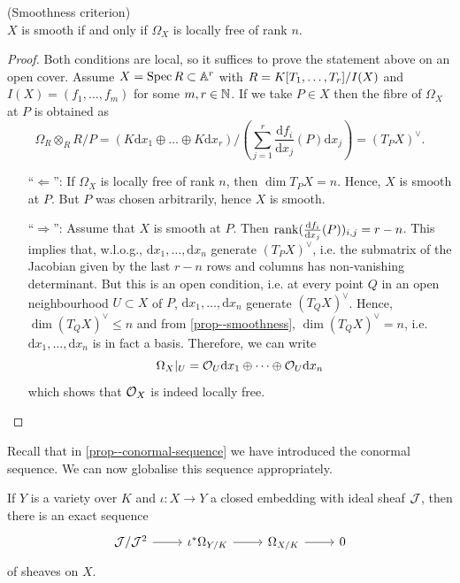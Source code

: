 \documentclass[a4paper,11pt]{article}
\begin{document}
			\begin{thm}
				(Smoothness criterion)\\ $X$ is smooth if and only if $\Omega_X$ is locally free of rank $n$.
			\end{thm}
			\begin{proof}
				Both conditions are local, so it suffices to prove the statement above on an open cover. Assume $X=\operatorname{Spec} R\subset\mathbb{A}^r$ with $R=K[T_1,\dots,T_{r}]/I(X)$ and $I(X)=(f_1,\dots,f_m)$ for some $m,r\in\mathbb{N}$. If we take $P\in X$ then the fibre of $\Omega_X$ at $P$ is obtained as
				\begin{equation*}
					\Omega_R\otimes_RR/P=(K\mathrm{d}x_1\oplus\dots\oplus K\mathrm{d}x_r)/(\sum_{j=1}^r\frac{\mathrm{d}f_i}{\mathrm{d}x_j}(P)\mathrm{d}x_j)=(T_PX)^\vee.
				\end{equation*} 
				\begin{enumerate}
					\item [``$\Leftarrow$'':] If $\Omega_X$ is locally free of rank $n$, then $\dim T_PX=n$. Hence, $X$ is smooth at $P$. But $P$ was chosen arbitrarily, hence $X$ is smooth.
					\item [``$\Rightarrow$'':] Assume that $X$ is smooth at $P$. Then $\rank(\frac{\mathrm{d}f_i}{\mathrm{d}x_j}(P))_{i,j}=r-n$. This implies that, w.l.o.g., $\mathrm{d}x_1,\dots,\mathrm{d}x_n$ generate $(T_PX)^\vee$, i.e. the submatrix of the Jacobian given by the last $r-n$ rows and columns has non-vanishing determinant. But this is an open condition, i.e. at every point $Q$ in an open neighbourhood $U\subset X$ of $P$, $\mathrm{d}x_1,\dots,\mathrm{d}x_n$ generate $(T_QX)^\vee$. Hence, $\dim(T_QX)^\vee\le n$ and from \autoref{prop--smoothness}, $\dim(T_QX)^\vee=n$, i.e. $\mathrm{d}x_1,\dots,\mathrm{d}x_n$ is in fact a basis. Therefore, we can write
					\begin{equation*}
						\Omega_X|_U=\mathcal{O}_U\mathrm{d}x_1\oplus\dots\oplus\mathcal{O}_U\mathrm{d}x_n
					\end{equation*}
					which shows that $\mathcal{O}_X$ is indeed locally free.
				\end{enumerate}
			\end{proof}

			Recall that in \autoref{prop--conormal-sequence} we have introduced the conormal sequence. We can now globalise this sequence appropriately.

			\begin{prop}
				If $Y$ is a variety over $K$ and $\iota:X\rightarrow Y$ a closed embedding with ideal sheaf $\mathcal{J}$, then there is an exact sequence
				\begin{equation*}
					\begin{tikzcd}
						\J/\J^2\ar[r] & \iota^\ast\Omega_{Y/K}\ar[r] & \Omega_{X/K}\ar[r] & 0
					\end{tikzcd}
				\end{equation*}
				of sheaves on $X$.
			\end{prop}
\end{document}
